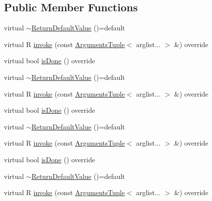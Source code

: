 \subsection*{Public Member Functions}
\begin{DoxyCompactItemize}
\item 
virtual \mbox{\hyperlink{structfakeit_1_1ReturnDefaultValue_ae1985454992034296a118d73dbd21890}{$\sim$\+Return\+Default\+Value}} ()=default
\item 
virtual R \mbox{\hyperlink{structfakeit_1_1ReturnDefaultValue_a9b57c8c162e162b97415595f966e9c4a}{invoke}} (const \mbox{\hyperlink{namespacefakeit_a476a37a598825e1b5dd67b3a176491a1}{Arguments\+Tuple}}$<$ arglist... $>$ \&) override
\item 
virtual bool \mbox{\hyperlink{structfakeit_1_1ReturnDefaultValue_a7fbbfec578ab1944c73379d63185e06e}{is\+Done}} () override
\item 
virtual \mbox{\hyperlink{structfakeit_1_1ReturnDefaultValue_ae1985454992034296a118d73dbd21890}{$\sim$\+Return\+Default\+Value}} ()=default
\item 
virtual R \mbox{\hyperlink{structfakeit_1_1ReturnDefaultValue_a9b57c8c162e162b97415595f966e9c4a}{invoke}} (const \mbox{\hyperlink{namespacefakeit_a476a37a598825e1b5dd67b3a176491a1}{Arguments\+Tuple}}$<$ arglist... $>$ \&) override
\item 
virtual bool \mbox{\hyperlink{structfakeit_1_1ReturnDefaultValue_a7fbbfec578ab1944c73379d63185e06e}{is\+Done}} () override
\item 
virtual \mbox{\hyperlink{structfakeit_1_1ReturnDefaultValue_ae1985454992034296a118d73dbd21890}{$\sim$\+Return\+Default\+Value}} ()=default
\item 
virtual R \mbox{\hyperlink{structfakeit_1_1ReturnDefaultValue_a9b57c8c162e162b97415595f966e9c4a}{invoke}} (const \mbox{\hyperlink{namespacefakeit_a476a37a598825e1b5dd67b3a176491a1}{Arguments\+Tuple}}$<$ arglist... $>$ \&) override
\item 
virtual bool \mbox{\hyperlink{structfakeit_1_1ReturnDefaultValue_a7fbbfec578ab1944c73379d63185e06e}{is\+Done}} () override
\item 
virtual \mbox{\hyperlink{structfakeit_1_1ReturnDefaultValue_ae1985454992034296a118d73dbd21890}{$\sim$\+Return\+Default\+Value}} ()=default
\item 
virtual R \mbox{\hyperlink{structfakeit_1_1ReturnDefaultValue_a9b57c8c162e162b97415595f966e9c4a}{invoke}} (const \mbox{\hyperlink{namespacefakeit_a476a37a598825e1b5dd67b3a176491a1}{Arguments\+Tuple}}$<$ arglist... $>$ \&) override

\end{DoxyCompactItemize}
